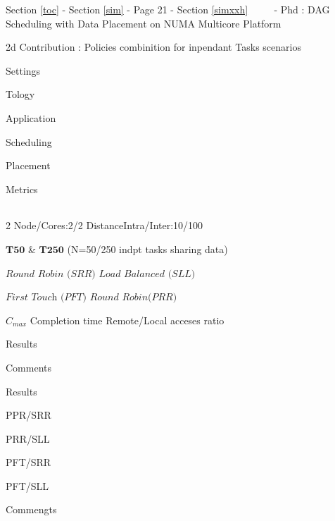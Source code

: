 \documentclass[11pt]{article}
\begin{document}
 

     {Section \ref{toc} - Section \ref{sim} - Page 21 - Section \ref{simxxh}
~~~~ - Phd : DAG Scheduling with Data Placement on NUMA Multicore
Platform}

2d Contribution : Policies combinition for inpendant Tasks scenarios

Settings

\textbar{}

Tology

\textbar{}

Application

\textbar{}

Scheduling

\textbar{}

Placement

\textbar{}

Metrics

\begin{longtable}[]{@{}lllll@{}}
\toprule
\bottomrule
\end{longtable}

\textbar{}

2 Node/Cores:2/2 DistanceIntra/Inter:10/100

\textbar{}

\(\textbf{T50}\) \& \(\textbf{T250}\) (N=50/250 indpt tasks sharing
data)

\textbar{}

\(\textit{Round Robin (SRR)}\) \(\textit{Load Balanced (SLL)}\)

\textbar{}

\(\textit{First Touch (PFT)}\) \(\textit{Round Robin(PRR)}\)

\textbar{}

\(C_{max}\) Completion time Remote/Local acceses ratio

\textbar{}

Results

Comments

\textbar{}

Results \textbar{}

PPR/SRR

\textbar{}

PRR/SLL

\textbar{}

PFT/SRR

\textbar{}

PFT/SLL

\textbar{}

Commengts

\begin{longtable}[]{@{}llllll@{}}
\toprule
\bottomrule
\end{longtable}
\end{document}
